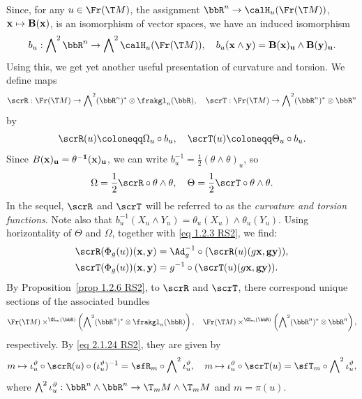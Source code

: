 \begin{rem}\label{rem 2.1.16 RS2}
    Since, for any $u\in\Fr(\T M)$, the assignment $\bbR^n\to \calH_u (\Fr(\T M))$, $\bf{x}\mapsto B(\bf{x})$, is an isomorphism of vector spaces, we have an induced isomorphism 
    \[b_u:\bigwedge\nolimits^2\bbR^n\to \bigwedge\nolimits^2 \calH_u(\Fr(\T M)),\quad b_u(\bf{x}\wedge\bf{y})=B(\bf{x})_u\wedge B(\bf{y})_u.\]
    Using this, we get yet another useful presentation of curvature and torsion. We define maps 
    \[\scrR:\Fr(\T M)\to \bigwedge\nolimits^2(\bbR^n)^\ast \otimes\frakgl_n(\bbR),\quad \scrT:\Fr(\T M)\to \bigwedge\nolimits^2(\bbR^n)^\ast\otimes\bbR^n\]
    by 
    \[\scrR(u)\coloneqq \Omega_u\circ b_u,\quad \scrT(u)\coloneqq \Theta_u\circ b_u.\label{eq 2.1.24 RS2}\]
    Since $B(\bf{x})_u=\theta^{-1}(\bf{x})_u$, we can write $b_u^{-1}=\frac12(\theta\wedge\theta)_u$, so 
    \[\Omega=\frac12\scrR\circ \theta\wedge\theta,\quad \Theta=\frac12\scrT\circ\theta\wedge\theta.\label{eq def affine curvature, torsion functions}\]
    In the sequel, $\scrR$ and $\scrT$ will be referred to as the \emph{curvature and torsion functions}. Note also that $b_u^{-1}(X_u\wedge Y_u)=\theta_u(X_u)\wedge\theta_u(Y_u)$. Using horizontality of $\Theta$ and $\Omega$, together with \eqref{eq 1.2.3 RS2}, we find:
    \begin{align}
        \scrR(\Phi_g(u))(\bf{x},\bf{y})&=\Ad_g^{-1}\circ (\scrR(u)(g\bf{x},g\bf{y})),\\
        \scrT(\Phi_g(u))(\bf{x},\bf{y})&= g^{-1}\circ (\scrT(u)(g\bf{x},g\bf{y})).
    \end{align}
    By Proposition~\ref{prop 1.2.6 RS2}, to $\scrR$ and $\scrT$, there correspond unique sections of the associated bundles 
    \[\Fr(\T M)\times^{\GL_n(\bbR)}\left(\bigwedge\nolimits^2(\bbR^n)^\ast \otimes \frakgl_n(\bbR)\right),\quad \Fr(\T M)\times^{\GL_n(\bbR)}\left(\bigwedge\nolimits^2(\bbR^n)^\ast \otimes\bbR^n\right),\]
    respectively. By \eqref{eq 2.1.24 RS2}, they are given by 
    \[m\mapsto \iota_u^\vartheta\circ \scrR(u)\circ (\iota_u^\vartheta)^{-1}=\sfR_m\circ\bigwedge\nolimits^2 \iota_u^\vartheta,\quad m\mapsto \iota_u^\vartheta\circ\scrT(u)=\sfT_m\circ \bigwedge\nolimits^2 \iota_u^\vartheta,\]
    where $\bigwedge\nolimits^2 \iota_u^\vartheta:\bbR^n\wedge\bbR^n\to \T_mM\wedge \T_mM$ and $m=\pi(u)$.
\end{rem}


